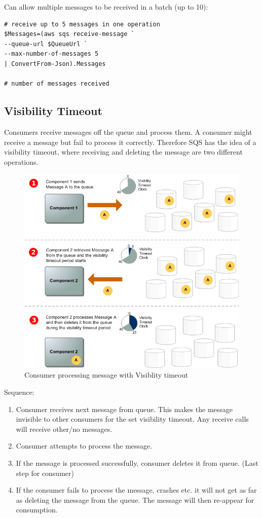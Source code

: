Can allow multiple messages to be received in a batch (up to 10):

\begin{verbatim}
# receive up to 5 messages in one operation
$Messages=(aws sqs receive-message `
--queue-url $QueueUrl `
--max-number-of-messages 5 
| ConvertFrom-Json).Messages

# number of messages received
\end{verbatim}

\subsection{Visibility Timeout}\label{visibility-timeout}

Consumers receive messages off the queue and process them. A consumer
might receive a message but fail to process it correctly. Therefore SQS
has the idea of a visibility timeout, where receiving and deleting the
message are two different operations.

\begin{figure}
\centering
\includegraphics[width=0.6\linewidth]{sqs_message_lifecycle}
\caption{Consumer processing message with Visiblity timeout{}}
\end{figure}

Sequence:

\begin{enumerate}
\def\labelenumi{\arabic{enumi}.}
\item
  Consumer receives next message from queue. This makes the message
  invisible to other consumers for the set visibility timeout. Any
  receive calls will receive other/no messages.
\item
  Consumer attempts to process the message.
\item
  If the message is processed successfully, consumer deletes it from
  queue. (Last step for consumer)
\item
  If the consumer fails to process the message, crashes etc. it will not
  get as far as deleting the message from the queue. The message will
  then re-appear for consumption.
\end{enumerate}


